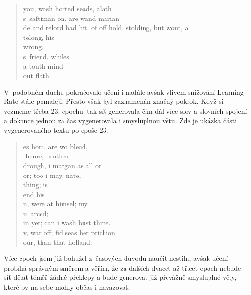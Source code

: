 \documentclass[a4paper]{article}
\begin{document}
\begin{quote}
you, wash horted seads, alath\\
s~saftiman on. are wand marian\\
de and relord had hit. of off hold. stolding, but wont, a\\
telong, his\\
 wrong.\\
 s~friend, whiles\\
 a touth mind\\
 out flath. \\
\end{quote}
V~podobném duchu pokračovalo učení i nadále avšak vlivem snižování Learning Rate stále pomaleji. Přesto však byl zaznamenán značný pokrok. Když si vezmeme třeba 23. epochu, tak síť generovala čím dál více slov a slovních spojení a dokonce jednou za čas vygenerovala i smysluplnou větu. Zde je ukázka části vygenerovaného textu po epoše 23:\par
\begin{quote}
es hort. are wo blead,\\
-henre, brothes\\
 drough, i margan as all or\\
 or; too i may, nate,\\
 thing; is\\
 end his\\
 n, were at himsel; my\\
 u~arced;\\
 in yet; can i wash bust thine.\\
 y, war off; fid seas her prichion\\
 our, than that holland:\\
\end{quote}
Více epoch jsem již bohužel z~časových důvodů naučit nestihl, avšak učení probíhá správným směrem a věřím, že za dalších dvacet až třicet epoch nebude síť dělat téměř žádné překlepy a bude generovat již převážně smysluplné věty, které by na sebe mohly občas i navazovat.
\clearpage
\end{document}
